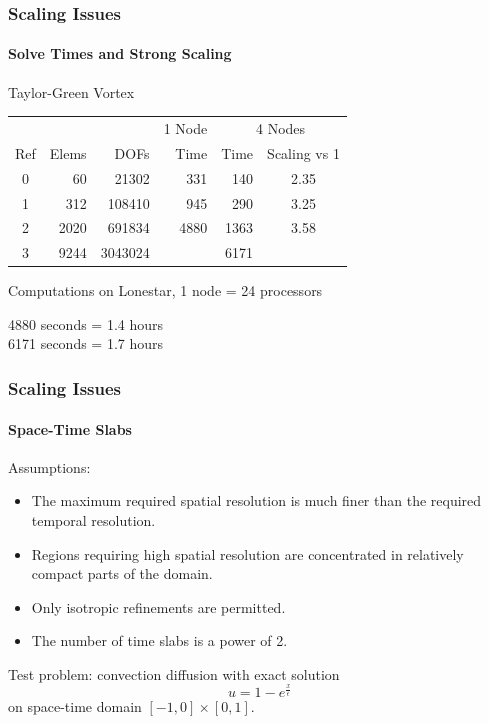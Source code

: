 \documentclass[18pt,xcolor=table]{beamer}
\begin{document}
\begin{frame}
\frametitle{Scaling Issues}
\framesubtitle{Solve Times and Strong Scaling}  %
\begin{block}{Taylor-Green Vortex}
\begin{table}[!ht]
\centering
\begin{tabular}{|crr|r|rc|}
\hline
& & & 1 Node & \multicolumn{2}{|c|}{4 Nodes} \\
Ref& Elems & DOFs & Time    & Time & Scaling vs 1 \\
\hline
0 & 60            & 21302      & 331    & 140   & 2.35 \\
1 & 312           & 108410     & 945    & 290   & 3.25 \\
2 & 2020          & 691834     & 4880   & 1363  & 3.58 \\
3 & 9244          & 3043024    &        & 6171  & \\
\hline
\end{tabular}
\end{table}
\end{block}
Computations on Lonestar, 1 node = 24 processors

4880 seconds = 1.4 hours\\
6171 seconds = 1.7 hours
\end{frame}



\begin{frame}
\frametitle{Scaling Issues}
\framesubtitle{Space-Time Slabs}  %
Assumptions:
\begin{itemize}
\item The maximum required spatial resolution is much finer than the required temporal resolution.
\item Regions requiring high spatial resolution are concentrated in relatively compact parts of the domain.
\item Only isotropic refinements are permitted.
\item The number of time slabs is a power of 2.
\end{itemize}
Test problem: convection diffusion with exact solution
\[
u=1-e^\frac{x}{\epsilon}
\]
on space-time domain $[-1,0]\times[0,1]$.
\end{frame}
\end{document}
